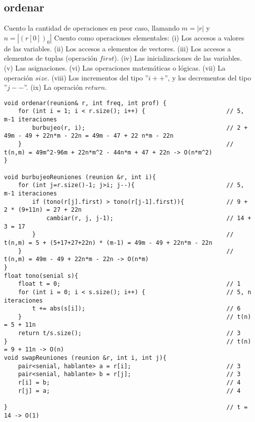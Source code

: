 \documentclass{article}
\begin{document}
\subsection{ordenar}
Cuento la cantidad de operaciones en peor caso, llamando $m=|r|$ y $n=|(r[0])_0|$
Cuento como operaciones elementales: \newline
(i) Los accesos a valores de las variables. \newline
(ii) Los accesos a elementos de vectores. \newline
(iii) Los accesos a elementos de tuplas (operación $first$). \newline
(iv) Las inicializaciones de las variables. \newline
(v) Las asignaciones. \newline
(vi) Las operaciones matemáticas o lógicas. \newline
(vii) La operación $size$. \newline
(viii) Los incrementos del tipo ”$i++$”, y los decrementos del tipo ”$j−−$”. \newline
(ix) La operación $return$. \newline

\begin{lstlisting}
void ordenar(reunion& r, int freq, int prof) {
    for (int i = 1; i < r.size(); i++) {                       // 5, m-1 iteraciones
        burbujeo(r, i);                                        // 2 + 49m - 49 + 22n*m - 22n = 49m - 47 + 22 n*m - 22n
    }                                                          // t(n,m) = 49m^2-96m + 22n*m^2 - 44n*m + 47 + 22n -> O(n*m^2)
}

void burbujeoReuniones (reunion &r, int i){
    for (int j=r.size()-1; j>i; j--){                          // 5, m-1 iteraciones
        if (tono(r[j].first) > tono(r[j-1].first)){            // 9 + 2 * (9+11n) = 27 + 22n
            cambiar(r, j, j-1);                                // 14 + 3 = 17
        }                                                      // t(n,m) = 5 + (5+17+27+22n) * (m-1) = 49m - 49 + 22n*m - 22n
    }                                                          // t(n,m) = 49m - 49 + 22n*m - 22n -> O(n*m)
}
float tono(senial s){
    float t = 0;                                               // 1
    for (int i = 0; i < s.size(); i++) {                       // 5, n iteraciones
        t += abs(s[i]);                                        // 6
    }                                                          // t(n) = 5 + 11n
    return t/s.size();                                         // 3
}                                                              // t(n) = 9 + 11n -> O(n)
void swapReuniones (reunion &r, int i, int j){
    pair<senial, hablante> a = r[i];                           // 3
    pair<senial, hablante> b = r[j];                           // 3
    r[i] = b;                                                  // 4
    r[j] = a;                                                  // 4

}                                                              // t = 14 -> O(1)
\end{lstlisting}
\end{document}
